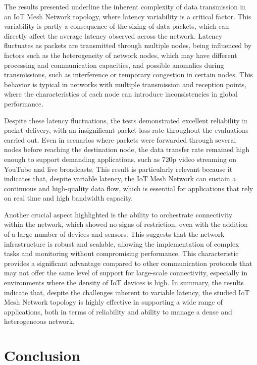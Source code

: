 \documentclass[journal]{IEEEtran}
\begin{document}
The results presented underline the inherent complexity of data transmission in an IoT Mesh Network topology, where latency variability is a critical factor. This variability is partly a consequence of the sizing of data packets, which can directly affect the average latency observed across the network. Latency fluctuates as packets are transmitted through multiple nodes, being influenced by factors such as the heterogeneity of network nodes, which may have different processing and communication capacities, and possible anomalies during transmissions, such as interference or temporary congestion in certain nodes. This behavior is typical in networks with multiple transmission and reception points, where the characteristics of each node can introduce inconsistencies in global performance.

Despite these latency fluctuations, the tests demonstrated excellent reliability in packet delivery, with an insignificant packet loss rate throughout the evaluations carried out. Even in scenarios where packets were forwarded through several nodes before reaching the destination node, the data transfer rate remained high enough to support demanding applications, such as 720p video streaming on YouTube and live broadcasts. This result is particularly relevant because it indicates that, despite variable latency, the IoT Mesh Network can sustain a continuous and high-quality data flow, which is essential for applications that rely on real time and high bandwidth capacity.

Another crucial aspect highlighted is the ability to orchestrate connectivity within the network, which showed no signs of restriction, even with the addition of a large number of devices and sensors. This suggests that the network infrastructure is robust and scalable, allowing the implementation of complex tasks and monitoring without compromising performance. This characteristic provides a significant advantage compared to other communication protocols that may not offer the same level of support for large-scale connectivity, especially in environments where the density of IoT devices is high. In summary, the results indicate that, despite the challenges inherent to variable latency, the studied IoT Mesh Network topology is highly effective in supporting a wide range of applications, both in terms of reliability and ability to manage a dense and heterogeneous network.

\section{Conclusion}
\label{sec:conclusao}
\end{document}
